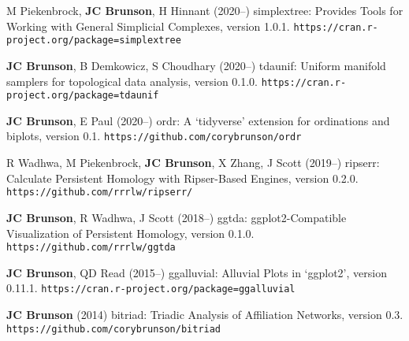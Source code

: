 \documentclass[10pt,a4paper]{article}
\begin{document}
\begin{enumerate}[label={[\arabic*]},labelindent=1cm,nolistsep]
\setcounter{enumi}{\value{paper}}
\item
M Piekenbrock, {\bfseries JC Brunson}, H Hinnant (2020--) {\sffamily simplextree}: Provides Tools for Working with General Simplicial Complexes, version 1.0.1. {\tt\small\nolinkurl{https://cran.r-project.org/package=simplextree}}
\item
{\bfseries JC Brunson}, B Demkowicz, S Choudhary (2020--) {\sffamily tdaunif}: Uniform manifold samplers for topological data analysis, version 0.1.0. {\tt\small\nolinkurl{https://cran.r-project.org/package=tdaunif}}
\item
{\bfseries JC Brunson}, E Paul (2020--) {\sffamily ordr}: A `tidyverse' extension for ordinations and biplots, version 0.1. {\tt\small\nolinkurl{https://github.com/corybrunson/ordr}}
\item
R Wadhwa, M Piekenbrock, {\bfseries JC Brunson}, X Zhang, J Scott (2019--) {\sffamily ripserr}: Calculate Persistent Homology with Ripser-Based Engines, version 0.2.0. {\tt\small\nolinkurl{https://github.com/rrrlw/ripserr/}}
\item
{\bfseries JC Brunson}, R Wadhwa, J Scott (2018--) {\sffamily ggtda}: ggplot2-Compatible Visualization of Persistent Homology, version 0.1.0. {\tt\small\nolinkurl{https://github.com/rrrlw/ggtda}}
\item
{\bfseries JC Brunson}, QD Read (2015--) {\sffamily ggalluvial}: Alluvial Plots in `ggplot2', version 0.11.1. {\tt\small\nolinkurl{https://cran.r-project.org/package=ggalluvial}}
\item
{\bfseries JC Brunson} (2014) {\sffamily bitriad}: Triadic Analysis of Affiliation Networks, version 0.3. {\tt\small\nolinkurl{https://github.com/corybrunson/bitriad}}
\setcounter{paper}{\value{enumi}}
\end{enumerate}
\end{document}
